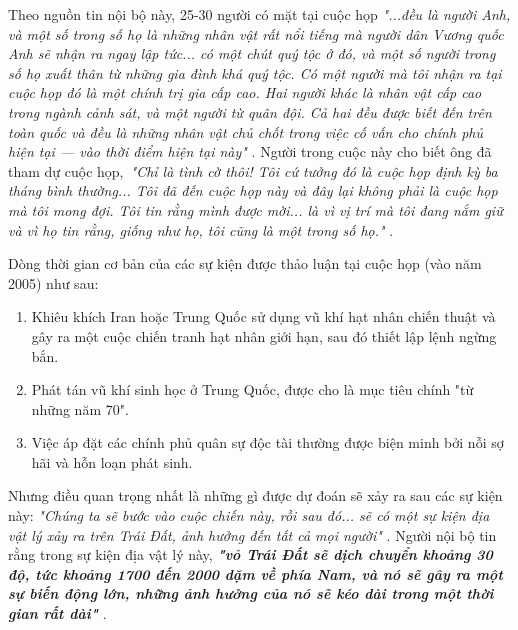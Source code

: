 Theo nguồn tin nội bộ này, 25-30 người có mặt tại cuộc họp \textit{"...đều là người Anh, và một số trong số họ là những nhân vật rất nổi tiếng mà người dân Vương quốc Anh sẽ nhận ra ngay lập tức... có một chút quý tộc ở đó, và một số người trong số họ xuất thân từ những gia đình khá quý tộc. Có một người mà tôi nhận ra tại cuộc họp đó là một chính trị gia cấp cao. Hai người khác là nhân vật cấp cao trong ngành cảnh sát, và một người từ quân đội. Cả hai đều được biết đến trên toàn quốc và đều là những nhân vật chủ chốt trong việc cố vấn cho chính phủ hiện tại — vào thời điểm hiện tại này"} \cite{4}. Người trong cuộc này cho biết ông đã tham dự cuộc họp,\ \textit{"Chỉ là tình cờ thôi! Tôi cứ tưởng đó là cuộc họp định kỳ ba tháng bình thường... Tôi đã đến cuộc họp này và đây lại không phải là cuộc họp mà tôi mong đợi. Tôi tin rằng mình được mời... là vì vị trí mà tôi đang nắm giữ và vì họ tin rằng, giống như họ, tôi cũng là một trong số họ."} \cite{4}.

Dòng thời gian cơ bản của các sự kiện được thảo luận tại cuộc họp (vào năm 2005) như sau:

\begin{flushleft}
\begin{enumerate}
    \item Khiêu khích Iran hoặc Trung Quốc sử dụng vũ khí hạt nhân chiến thuật và gây ra một cuộc chiến tranh hạt nhân giới hạn, sau đó thiết lập lệnh ngừng bắn.
    \item Phát tán vũ khí sinh học ở Trung Quốc, được cho là mục tiêu chính "từ những năm 70".
    \item Việc áp đặt các chính phủ quân sự độc tài thường được biện minh bởi nỗi sợ hãi và hỗn loạn phát sinh.
\end{enumerate}
\end{flushleft}

Nhưng điều quan trọng nhất là những gì được dự đoán sẽ xảy ra sau các sự kiện này: \textit{"Chúng ta sẽ bước vào cuộc chiến này, rồi sau đó... sẽ có một sự kiện địa vật lý xảy ra trên Trái Đất, ảnh hưởng đến tất cả mọi người"} \cite{4}. Người nội bộ tin rằng trong sự kiện địa vật lý này, \textit{\textbf{"vỏ Trái Đất sẽ dịch chuyển khoảng 30 độ, tức khoảng 1700 đến 2000 dặm về phía Nam, và nó sẽ gây ra một sự biến động lớn, những ảnh hưởng của nó sẽ kéo dài trong một thời gian rất dài"}} \cite{4}.

